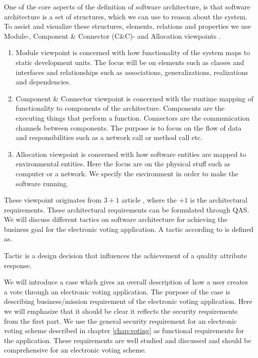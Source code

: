 \noindent
One of the core aspects of the definition of software architecture, is that software architecture is a set of structures, which we can use to reason about the system. To assist and visualize these structures, elements, relations and properties we use Module-, Component \& Connector (C\&C)- and Allocation viewpoints \cite{3+1}. 

\begin{enumerate}
    \item Module viewpoint is concerned with how functionality of the system maps to static development units. The focus will be on elements such as classes and interfaces and relationships such as associations, generalizations, realizations and dependencies.
    \item Component \& Connector viewpoint is concerned with the runtime mapping of functionality to components of the architecture. Components are the executing things that perform a function. Connectors are the communication channels between components. The purpose is to focus on the flow of data and responsibilities such as a network call or method call etc.
    \item Allocation viewpoint is concerned with how software entities are mapped to environmental entities. Here the focus are on the physical stuff such as computer or a network. We specify the environment in order to make the software running. 
\end{enumerate}

\noindent
These viewpoint originates from $3+1$ article \cite{3+1}, where the $+1$ is the architectural requirements. These architectural requirements can be formulated through QAS.\\

\noindent
We will discuss different tactics on software architecture for achieving the business goal for the electronic voting application. A tactic according to \cite{Bass} is defined as.

\begin{defi}
Tactic is a design decision that influences the achievement of a quality attribute response. 
\end{defi}

\noindent
We will introduce a case which gives an overall description of how a user creates a vote through an electronic voting application. The purpose of the case is describing business/mission requirement of the electronic voting application. Here we will emphasize that it should be clear it reflects the security requirements from the first part. We use the general security requirement for an electronic voting scheme described in chapter \ref{chap:voting} as functional requirements for the application. These requirements are well studied and discussed and should be comprehensive for an electronic voting scheme.